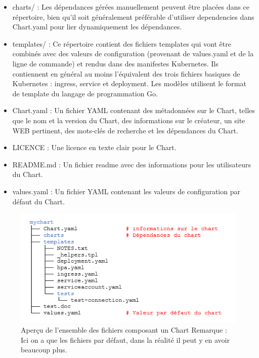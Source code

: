 \documentclass[11pt,fleqn]{book} %
\begin{document}
\begin{itemize}
        \item charts/ : Les dépendances gérées manuellement peuvent être placées dans ce répertoire, bien qu'il soit généralement préférable d'utiliser dependencies dans Chart.yaml pour lier dynamiquement les dépendances.
        \item templates/ : Ce répertoire contient des fichiers templates qui vont être combinés avec des valeurs de configuration (provenant de values.yaml et de la ligne de commande) et rendus dans des manifestes Kubernetes. Ils contiennent en général au moins l'équivalent des trois fichiers basiques de Kubernetes : ingress, service et deployment. Les modèles utilisent le format de template du langage de programmation Go.
        \item Chart.yaml : Un fichier YAML contenant des métadonnées sur le Chart, telles que le nom et la version du Chart, des informations sur le créateur, un site WEB pertinent, des mots-clés de recherche et les dépendances du Chart.
      \item LICENCE : Une licence en texte clair pour le Chart.
     \item README.md : Un fichier readme avec des informations pour les utilisateurs du Chart.
      \item values.yaml : Un fichier YAML contenant les valeurs de configuration par défaut du Chart.\newline
\end{itemize} 

\vspace{-0.5cm}
\begin{figure}[H]\centering
\renewcommand{\figurename}{Capture d'écran}
\includegraphics[scale=0.8]{Pictures/Comparaison/deployer/Kubernetes/helmChart.png}
\captionsetup{margin=1.5cm,format=hang,justification=justified}
\caption[]{Aperçu de l'ensemble des fichiers composant un Chart\newline
Remarque : Ici on a que les fichiers par défaut, dans la réalité il peut y en avoir beaucoup plus. \newline}
\end{figure}
\end{document}
